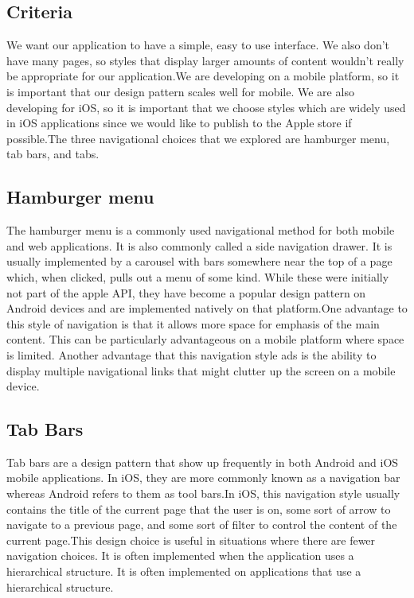\documentclass[onecolumn, draftclsnofoot,10pt, compsoc]{IEEEtran}
\begin{document}
  \subsection{Criteria}
    We want our application to have a simple, easy to use interface. We also don't have many pages, so styles that display larger amounts of content wouldn't really be appropriate for our application.We are developing on a mobile platform, so it is important that our design pattern scales well for mobile. We are also developing for iOS, so it is important that we choose styles which are widely used in iOS applications since we would like to publish to the Apple store if possible.The three navigational choices that we explored are hamburger menu, tab bars, and tabs.
    \subsection{Hamburger menu}
    The hamburger menu is a commonly used navigational method for both mobile and web applications.\cite{HamburgerMenu} It is also commonly called a side navigation drawer. It is usually implemented by a carousel with bars somewhere near the top of a page which, when clicked, pulls out a menu of some kind. While these were initially not part of the apple API, they have become a popular design pattern on Android devices and are implemented natively on that platform.One advantage to this style of navigation is that it allows more space for emphasis of the main content. This can be particularly advantageous on a mobile platform where space is limited. Another advantage that this navigation style ads is the ability to display multiple navigational links that might clutter up the screen on a mobile device.
    \subsection{Tab Bars}
    Tab bars are a design pattern that show up frequently in both Android and iOS mobile applications. \cite{Comparison}In iOS, they are more commonly known as a navigation bar whereas Android refers to them as tool bars.In iOS, this navigation style usually contains the title of the current page that the user is on, some sort of arrow to navigate to a previous page, and some sort of filter to control the content of the current page.This design choice is useful in situations where there are fewer navigation choices. It is often implemented when the application uses a hierarchical structure. It is often implemented on applications that use a hierarchical structure. 
\end{document}
